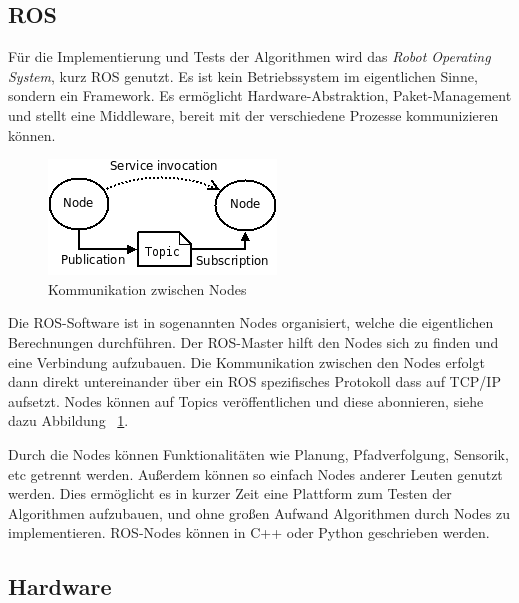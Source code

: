 \documentclass[11pt,a4paper]{article}
\begin{document}
{\subsection{ROS}

F\"ur die Implementierung und Tests der Algorithmen wird das \textit{Robot Operating System}, kurz ROS genutzt. Es ist kein Betriebssystem im eigentlichen Sinne, sondern ein Framework. Es erm\"oglicht Hardware-Abstraktion, Paket-Management und stellt eine Middleware, bereit mit der verschiedene Prozesse kommunizieren k\"onnen. \cite{rosWiki}

\begin{figure}[h]
	\includegraphics[width=\linewidth]{pictures/ROS_basic_concepts.png}
	\caption{Kommunikation zwischen Nodes \label{fig:rosNodes}}
\end{figure}

Die ROS-Software ist in sogenannten Nodes organisiert, welche die eigentlichen Berechnungen durchf\"uhren. Der ROS-Master hilft den Nodes sich zu finden und eine Verbindung aufzubauen. Die Kommunikation zwischen den Nodes erfolgt dann direkt untereinander \"uber ein ROS spezifisches Protokoll dass auf TCP/IP aufsetzt. Nodes k\"onnen auf Topics ver\"offentlichen und diese abonnieren, siehe dazu Abbildung ~\ref{fig:rosNodes}. \cite{rosConcepts}


Durch die Nodes k\"onnen Funktionalit\"aten wie Planung, Pfadverfolgung, Sensorik, etc getrennt werden. Au{\ss}erdem k\"onnen so einfach Nodes anderer Leuten genutzt werden. Dies erm\"oglicht es in kurzer Zeit eine Plattform zum Testen der Algorithmen aufzubauen, und ohne gro{\ss}en Aufwand Algorithmen durch Nodes zu implementieren. ROS-Nodes k\"onnen in C++ oder Python geschrieben werden.

\subsection{Hardware}
 
}
\end{document}
